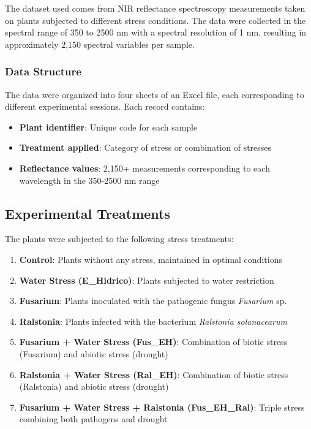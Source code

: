 \documentclass[12pt,a4paper]{article}
\begin{document}
The dataset used comes from NIR reflectance spectroscopy measurements taken on plants subjected to different stress conditions. The data were collected in the spectral range of 350 to 2500 nm with a spectral resolution of 1 nm, resulting in approximately 2,150 spectral variables per sample.

\subsubsection{Data Structure}

The data were organized into four sheets of an Excel file, each corresponding to different experimental sessions. Each record contains:

\begin{itemize}
    \item \textbf{Plant identifier}: Unique code for each sample
    \item \textbf{Treatment applied}: Category of stress or combination of stresses
    \item \textbf{Reflectance values}: 2,150+ measurements corresponding to each wavelength in the 350-2500 nm range
\end{itemize}

\subsection{Experimental Treatments}

The plants were subjected to the following stress treatments:

\begin{enumerate}
    \item \textbf{Control}: Plants without any stress, maintained in optimal conditions
    \item \textbf{Water Stress (E\_Hidrico)}: Plants subjected to water restriction
    \item \textbf{Fusarium}: Plants inoculated with the pathogenic fungus \textit{Fusarium} sp.
    \item \textbf{Ralstonia}: Plants infected with the bacterium \textit{Ralstonia solanacearum}
    \item \textbf{Fusarium + Water Stress (Fus\_EH)}: Combination of biotic stress (Fusarium) and abiotic stress (drought)
    \item \textbf{Ralstonia + Water Stress (Ral\_EH)}: Combination of biotic stress (Ralstonia) and abiotic stress (drought)
    \item \textbf{Fusarium + Water Stress + Ralstonia (Fus\_EH\_Ral)}: Triple stress combining both pathogens and drought
\end{enumerate}
\end{document}

